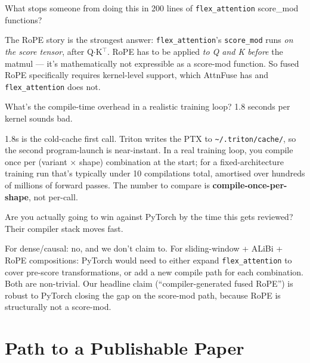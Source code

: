 \documentclass[11pt]{article}
\begin{document}
\begin{question}{What stops someone from doing this in 200 lines of
\texttt{flex\_attention} score\_mod functions?}
\end{question}
\begin{answer}
The RoPE story is the strongest answer: \texttt{flex\_attention}'s
\texttt{score\_mod} runs \emph{on the score tensor}, after Q$\cdot$K$^\top$.
RoPE has to be applied \emph{to Q and K before} the matmul --- it's
mathematically not expressible as a score-mod function. So fused RoPE
specifically requires kernel-level support, which AttnFuse has and
\texttt{flex\_attention} does not.
\end{answer}

\begin{question}{What's the compile-time overhead in a realistic
training loop? 1.8 seconds per kernel sounds bad.}
\end{question}
\begin{answer}
1.8s is the cold-cache first call. Triton writes the PTX to
\texttt{\textasciitilde/.triton/cache/}, so the second program-launch is
near-instant. In a real training loop, you compile once per
(variant $\times$ shape) combination at the start; for a fixed-architecture
training run that's typically under 10 compilations total, amortised over
hundreds of millions of forward passes. The number to compare is
\textbf{compile-once-per-shape}, not per-call.
\end{answer}

\begin{question}{Are you actually going to win against PyTorch by the time
this gets reviewed? Their compiler stack moves fast.}
\end{question}
\begin{answer}
For dense/causal: no, and we don't claim to. For sliding-window + ALiBi +
RoPE compositions: PyTorch would need to either expand \texttt{flex\_attention}
to cover pre-score transformations, or add a new compile path for each
combination. Both are non-trivial. Our headline claim (``compiler-generated
fused RoPE'') is robust to PyTorch closing the gap on the score-mod path,
because RoPE is structurally not a score-mod.
\end{answer}

\section{Path to a Publishable Paper}
\end{document}
